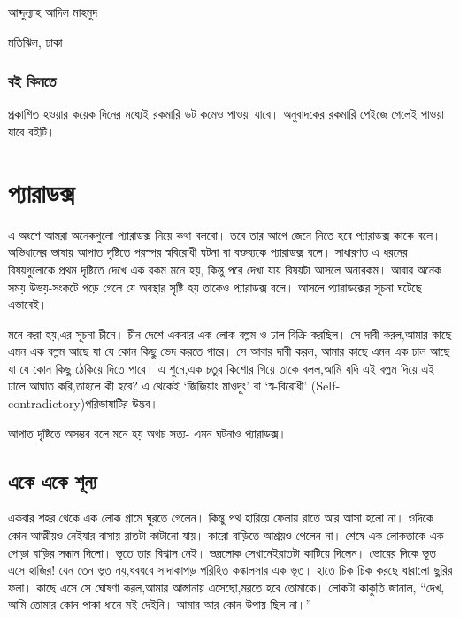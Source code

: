 \documentclass[
]{book}
\begin{document}
আব্দুল্যাহ আদিল মাহমুদ

মতিঝিল, ঢাকা

\hypertarget{ux9acux987-ux995ux9bfux9a8ux9a4ux9c7}{%
\section{বই কিনতে}\label{ux9acux987-ux995ux9bfux9a8ux9a4ux9c7}}

প্রকাশিত হওয়ার কয়েক দিনের মধ্যেই রকমারি ডট কমেও পাওয়া যাবে। অনুবাদকের \href{https://www.rokomari.com/book/author/47631}{রকমারি পেইজে} গেলেই পাওয়া যাবে বইটি।

\hypertarget{part-ux9aaux9cdux9afux9beux9b0ux9beux9a1ux995ux9cdux9b8}{%
\part{প্যারাডক্স}\label{part-ux9aaux9cdux9afux9beux9b0ux9beux9a1ux995ux9cdux9b8}}

এ অংশে আমরা অনেকগুলো প্যারাডক্স নিয়ে কথা বলবো। তবে তার আগে জেনে নিতে হবে প্যারাডক্স কাকে বলে। অভিধানের ভাষায় আপাত দৃষ্টিতে পরস্পর স্ববিরোধী ঘটনা বা বক্তব্যকে প্যারাডক্স বলে। সাধারণত এ ধরনের বিষয়গুলোকে প্রথম দৃষ্টিতে দেখে এক রকম মনে হয়, কিন্তু পরে দেখা যায় বিষয়টা আসলে অন্যরকম। আবার অনেক সময় উভয়-সংকটে পড়ে গেলে যে অবস্থার সৃষ্টি হয় তাকেও প্যারাডক্স বলে। আসলে প্যারাডক্সের সূচনা ঘটেছে এভাবেই।

মনে করা হয়,এর সূচনা চীনে। চীন দেশে একবার এক লোক বল্লম ও ঢাল বিক্রি করছিল। সে দাবী করল,আমার কাছে এমন এক বল্লম আছে যা যে কোন কিছু ভেদ করতে পারে। সে আবার দাবী করল, আমার কাছে এমন এক ঢাল আছে যা যে কোন কিছু ঠেকিয়ে দিতে পারে। এ শুনে,এক চতুর কিশোর গিয়ে তাকে বলল,আমি যদি এই বল্লম দিয়ে এই ঢালে আঘাত করি,তাহলে কী হবে?
এ থেকেই `জিজিয়াং মাওদুং' বা `স্ব-বিরোধী' (Self-contradictory)পরিভাষাটির উদ্ভব।

আপাত দৃষ্টিতে অসম্ভব বলে মনে হয় অথচ সত্য- এমন ঘটনাও প্যারাডক্স।

\hypertarget{one-one-zero}{%
\chapter{একে একে শূন্য}\label{one-one-zero}}

একবার শহর থেকে এক লোক গ্রামে ঘুরতে গেলেন। কিন্তু পথ হারিয়ে ফেলায় রাতে আর আসা হলো না। ওদিকে কোন আত্মীয়ও নেইযার বাসায় রাতটা কাটানো যায়। কারো বাড়িতে আশ্রয়ও পেলেন না। শেষে এক লোকতাকে এক পোড়া বাড়ির সন্ধান দিলো। ভূতে তার বিশ্বাস নেই। ভদ্রলোক সেখানেইরাতটা কাটিয়ে দিলেন। ভোরের দিকে ভূত এসে হাজির! যেন তেন ভূত নয়,ধবধবে সাদাকাপড় পরিহিত কঙ্কালসার এক ভূত। হাতে চিক চিক করছে ধারালো ছুরির ফলা। কাছে এসে সে ঘোষণা করল,আমার আস্তানায় এসেছো,মরতে হবে তোমাকে। লোকটা কাকুতি জানাল, ``দেখ, আমি তোমার কোন পাকা ধানে মই দেইনি। আমার আর কোন উপায় ছিল না।''
\end{document}
